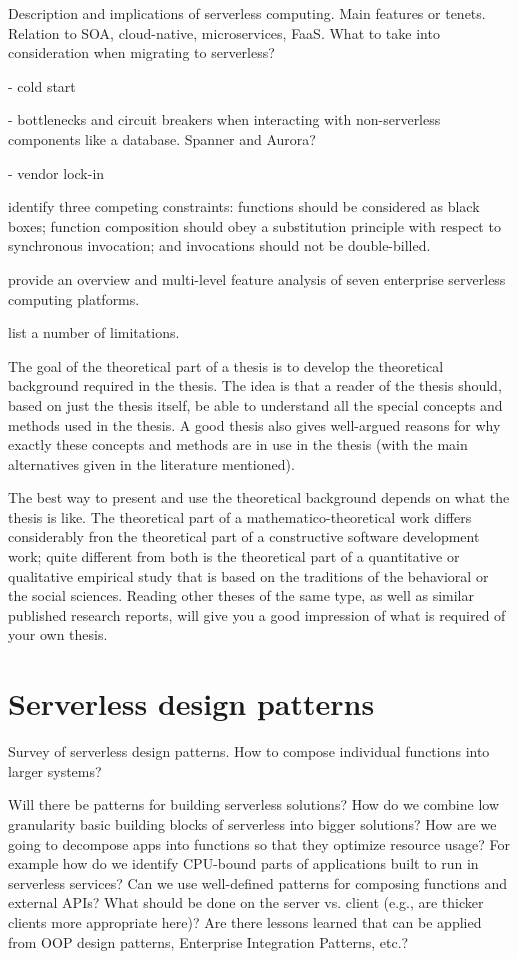 \documentclass[utf8,english]{gradu3}
\begin{document}
Description and implications of serverless computing. Main features or tenets.
Relation to SOA, cloud-native, microservices, FaaS.
What to take into consideration when migrating to serverless?

- cold start

- bottlenecks and circuit breakers when interacting with non-serverless components like a database. Spanner and Aurora?

- vendor lock-in

\textcite{baldini17trilemma} identify three competing constraints: functions should be considered as black boxes; function composition should obey a substitution principle with respect to synchronous invocation; and invocations should not be double-billed.

\textcite{lynn2017preliminary} provide an overview and multi-level feature analysis of seven enterprise serverless computing platforms.

\textcite{adzic2017serverless} list a number of limitations.

The goal of the theoretical part of a thesis is to develop the
theoretical background required in the thesis.  The idea is that a
reader of the thesis should, based on just the thesis itself, be able
to understand all the special concepts and methods used in the thesis.
A good thesis also gives well-argued reasons for why exactly these
concepts and methods are in use in the thesis (with the main
alternatives given in the literature mentioned).

The best way to present and use the theoretical background depends on
what the thesis is like.  The theoretical part of a
mathematico-theoretical work differs considerably fron the theoretical
part of a constructive software development work; quite different from
both is the theoretical part of a quantitative or qualitative
empirical study that is based on the traditions of the behavioral or
the social sciences.  Reading other theses of the same type, as well
as similar published research reports, will give you a good impression
of what is required of your own thesis.

\chapter{Serverless design patterns}

Survey of serverless design patterns. How to compose individual functions into larger systems?

Will there be patterns for building serverless solutions? How do we combine low granularity basic building blocks of serverless into bigger solutions? How are we going to decompose apps into functions so that they optimize resource usage? For example how do we identify CPU-bound parts of applications built to run in serverless services? Can we use well-defined patterns for composing functions and external APIs? What should be done on the server vs. client (e.g., are thicker clients more appropriate here)? Are there lessons learned that can be applied from OOP design patterns, Enterprise Integration Patterns, etc.? \parencite{baldini17currentTrends}
\end{document}
